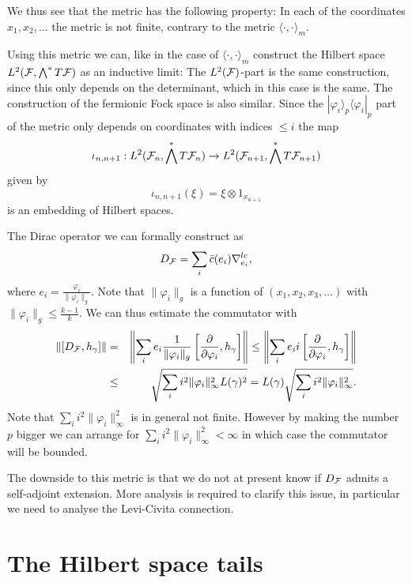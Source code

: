 \documentclass[letterpaper,11pt]{article}
\def\cf{{\cal F}}
\newcommand{\cF}{{\cal F}}
\begin{document}
We thus see that the metric has the following property: In each of the coordinates $x_1,x_2,\ldots$ the metric is not finite, contrary to the metric $\langle \cdot , \cdot \rangle_{m}$. 

Using this metric we can, like in the case of $\langle \cdot , \cdot \rangle_{m}$ construct the Hilbert space $L^2(\cF,\bigwedge^* T\cf )$ as an inductive limit: The $L^2(\cf)$-part is the same construction, since this only depends on the determinant, which in this case is the same.  The construction of the fermionic Fock space is also similar. Since the $|\varphi_i\rangle_p \langle \varphi_i|_p$ part of the metric only depends on coordinates with indices $\leq i$ the map 
$$\iota_{n,n+1}:L^2 (\cf_n , \bigwedge^* T\cf_n) \to L^2 (\cf_{n+1} , \bigwedge^* T\cf_{n+1})  $$
  given by
  $$ \iota_{n,n+1} (\xi)=\xi\otimes 1_{x_{n+1}}$$
  is an embedding of Hilbert spaces.

The Dirac operator we can formally construct as 
$$D_\cf=\sum_{i} \bar{c}(e_i)\nabla_{e_i}^{lc}    ,$$
where $e_i =\frac{\varphi_i}{\|\varphi_i\|_g}$. Note that $\|\varphi_i\|_g$ is a function of  $(x_1,x_2,x_3,\ldots)$ with $\|\varphi_i\|_g\leq \frac{k-1}{k}$. We can thus estimate the commutator with 
\begin{eqnarray*}
\left\|  [D_\cf,h_\gamma ]  \right\| &=& \left\|  \sum_i e_i    \frac{1}{\|\varphi_i \|_g}\left[  \frac{\partial}{\partial \varphi_i},h_\gamma \right]  \right\| \leq  \left\|  \sum_i e_i     i\left[  \frac{\partial}{\partial \varphi_i},h_\gamma \right]  \right\| \\
& \leq & \sqrt{ \sum_i   i^2    \| \varphi_i\|_\infty^2L(\gamma)^2} = L(\gamma)\sqrt{ \sum_i   i^2     \| \varphi_i\|_\infty^2} .
\end{eqnarray*}
Note that $\sum_i   i^2     \| \varphi_i\|_\infty^2$ is in general not finite. However by making the  number $p$ bigger we can arrange for $\sum_i   i^2     \| \varphi_i\|_\infty^2 <\infty$ in which case the commutator will be bounded.

The downside to this metric is that we do not at present know if $D_\cf$ admits a self-adjoint extension. More analysis is required to clarify this issue, in particular we need to analyse the Levi-Civita connection. 






\section{The Hilbert space tails}
\end{document}
